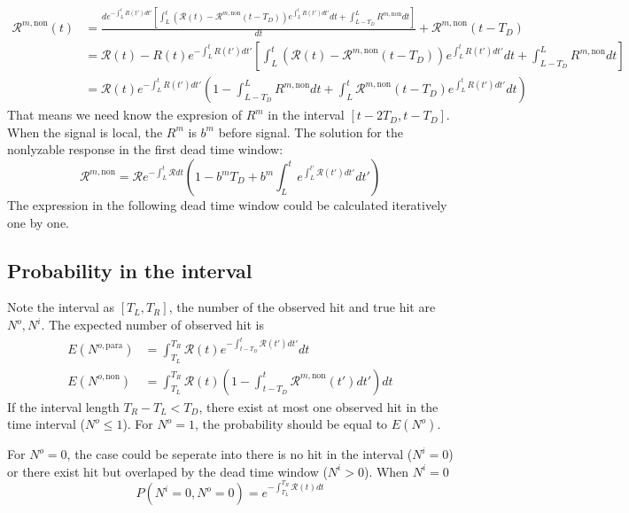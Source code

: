 \begin{equation}
\begin{aligned}
\mathcal{R}^{m,\mathrm{non}}(t)&=\frac{d e^{-\int_{L}^{t}{R(t')dt'}}\left[\int_{L}^{t}{(\mathcal{R}(t)-\mathcal{R}^{m,\mathrm{non}}(t-T_D))e^{\int_{L}^{t}{R(t')dt'}}dt} + \int_{L-T_D}^{L}{R^{m,\mathrm{non}}dt}\right]}{dt}+\mathcal{R}^{m,\mathrm{non}}(t-T_D)\\
&=\mathcal{R}(t)-R(t)e^{-\int_{L}^{t}{R(t')dt'}}\left[\int_{L}^{t}{(\mathcal{R}(t)-\mathcal{R}^{m,\mathrm{non}}(t-T_D))e^{\int_{L}^{t}{R(t')dt'}}dt}+\int_{L-T_D}^{L}{R^{m,\mathrm{non}}dt}\right]\\
&=\mathcal{R}(t)e^{-\int_{L}^{t}{R(t')dt'}}(1-\int_{L-T_D}^{L}{R^{m,\mathrm{non}}dt}+\int_{L}^{t}{\mathcal{R}^{m,\mathrm{non}}(t-T_D)e^{\int_{L}^{t}{R(t')dt'}}dt})
\end{aligned}
\end{equation}
That means we need know the expresion of $R^m$ in the interval $[t-2T_D,t-T_D]$. When the signal is local, the $R^m$ is $b^m$ before signal. The solution for the nonlyzable response in the first dead time window:
\begin{equation}
	\mathcal{R}^{m,\mathrm{non}}=\mathcal{R}e^{-\int_{L}^t{\mathcal{R}dt}}(1-b^mT_D+b^m\int^{t}_{L}{e^{\int_{L}^{t'}{\mathcal{R}(t')dt'}}dt'})
\end{equation}
The expression in the following dead time window could be calculated iteratively one by one.

\subsection{Probability in the interval}
Note the interval as $[T_L, T_R]$, the number of the observed hit and true hit are $N^{o}, N^{i}$. The expected number of observed hit is
\begin{equation}
\begin{aligned}
E(N^{o,\mathrm{para}})&=\int_{T_L}^{T_R}{\mathcal{R}(t)e^{-\int_{t-T_D}^{t}{\mathcal{R}(t')dt'}}dt}\\
E(N^{o,\mathrm{non}})&=\int_{T_L}^{T_R}{\mathcal{R}(t)(1-\int_{t-T_D}^{t}{\mathcal{R}^{m,\mathrm{non}}(t')dt'})dt}
\end{aligned}
\end{equation}
If the interval length $T_R-T_L<T_D$, there exist at most one observed hit in the time interval ($N^o\leq1$). For $N^o=1$, the probability should be equal to $E(N^o)$.

For $N^o=0$, the case could be seperate into there is no hit in the interval ($N^i=0$) or there exist hit but overlaped by the dead time window ($N^i>0$). When $N^i=0$
\begin{equation}
P(N^i=0,N^o=0)=e^{-\int_{T_L}^{T_R}{\mathcal{R}(t)dt}}
\end{equation}
